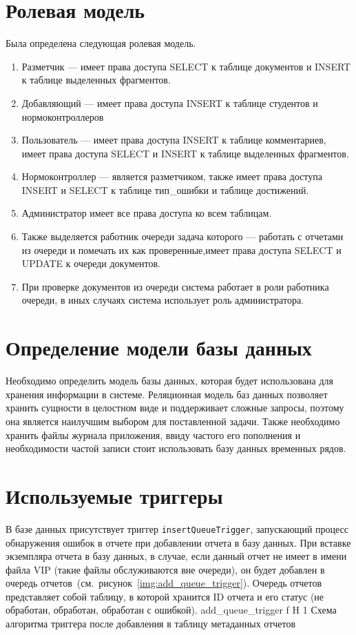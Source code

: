 \section{Ролевая модель}
Была определена следующая ролевая модель.
\begin{enumerate}
	\item Разметчик --- имеет права доступа SELECT к таблице документов и INSERT к таблице выделенных фрагментов.
	\item Добавляющий --- имеет права доступа INSERT к таблице студентов и нормоконтроллеров
	\item Пользователь --- имеет права доступа INSERT к таблице комментариев, имеет права доступа SELECT  и INSERT к таблице выделенных фрагментов.
	\item Нормоконтроллер --- является разметчиком, также имеет права доступа INSERT и SELECT к таблице тип\_ошибки и таблице достижений.
	\item Администратор имеет все права доступа ко всем таблицам.
	\item Также выделяется работник очереди задача которого --- работать с отчетами из очереди и помечать их как проверенные,имеет права доступа SELECT и UPDATE к очереди документов.
	\item При проверке документов из очереди система работает в роли работника очереди, в иных случаях система использует роль администратора.
\end{enumerate}

\section{Определение модели базы данных}
Необходимо определить модель базы данных, которая будет использована для хранения информации в системе. Реляционная модель баз данных позволяет хранить сущности в целостном виде и поддерживает сложные запросы, поэтому она является наилучшим выбором для поставленной задачи. Также необходимо хранить файлы журнала приложения, ввиду частого его пополнения и необходимости частой записи стоит использовать базу данных временных рядов.

\section{Используемые триггеры}
В базе данных присутствует триггер \texttt{insertQueueTrigger}, запускающий процесс обнаружения ошибок в отчете при добавлении отчета в базу данных. При вставке экземпляра отчета в базу данных, в случае, если данный отчет не имеет в имени файла VIP (такие файлы обслуживаются вне очереди), он будет добавлен в очередь отчетов~(см.~рисунок~\ref{img:add_queue_trigger}). Очередь отчетов представляет собой таблицу, в которой хранится ID отчета и его статус (не обработан, обработан, обработан с ошибкой).
{add_queue_trigger} %
{f} %
{H} %
{1\textwidth} %
{Схема алгоритма триггера после добавления в таблицу метаданных отчетов} %


